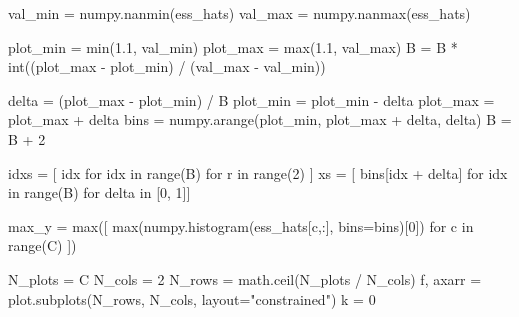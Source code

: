 \documentclass[
  letterpaper,
  DIV=11,
  numbers=noendperiod]{scrartcl}
\newenvironment{Shaded}{\begin{snugshade}}{\end{snugshade}}
\newcommand{\BuiltInTok}[1]{\textcolor[rgb]{0.00,0.23,0.31}{#1}}
\newcommand{\ControlFlowTok}[1]{\textcolor[rgb]{0.00,0.23,0.31}{#1}}
\newcommand{\DecValTok}[1]{\textcolor[rgb]{0.68,0.00,0.00}{#1}}
\newcommand{\FloatTok}[1]{\textcolor[rgb]{0.68,0.00,0.00}{#1}}
\newcommand{\KeywordTok}[1]{\textcolor[rgb]{0.00,0.23,0.31}{#1}}
\newcommand{\NormalTok}[1]{\textcolor[rgb]{0.00,0.23,0.31}{#1}}
\newcommand{\OperatorTok}[1]{\textcolor[rgb]{0.37,0.37,0.37}{#1}}
\newcommand{\StringTok}[1]{\textcolor[rgb]{0.13,0.47,0.30}{#1}}
\begin{document}
\begin{Shaded}
\begin{Highlighting}[]
\NormalTok{  val\_min }\OperatorTok{=}\NormalTok{ numpy.nanmin(ess\_hats)}
\NormalTok{  val\_max }\OperatorTok{=}\NormalTok{ numpy.nanmax(ess\_hats)}

\NormalTok{  plot\_min }\OperatorTok{=} \BuiltInTok{min}\NormalTok{(}\FloatTok{1.1}\NormalTok{, val\_min)}
\NormalTok{  plot\_max }\OperatorTok{=} \BuiltInTok{max}\NormalTok{(}\FloatTok{1.1}\NormalTok{, val\_max)}
\NormalTok{  B }\OperatorTok{=}\NormalTok{ B }\OperatorTok{*} \BuiltInTok{int}\NormalTok{((plot\_max }\OperatorTok{{-}}\NormalTok{ plot\_min) }\OperatorTok{/}\NormalTok{ (val\_max }\OperatorTok{{-}}\NormalTok{ val\_min))}

\NormalTok{  delta }\OperatorTok{=}\NormalTok{ (plot\_max }\OperatorTok{{-}}\NormalTok{ plot\_min) }\OperatorTok{/}\NormalTok{ B}
\NormalTok{  plot\_min }\OperatorTok{=}\NormalTok{ plot\_min }\OperatorTok{{-}}\NormalTok{ delta}
\NormalTok{  plot\_max }\OperatorTok{=}\NormalTok{ plot\_max }\OperatorTok{+}\NormalTok{ delta}
\NormalTok{  bins }\OperatorTok{=}\NormalTok{ numpy.arange(plot\_min, plot\_max }\OperatorTok{+}\NormalTok{ delta, delta)}
\NormalTok{  B }\OperatorTok{=}\NormalTok{ B }\OperatorTok{+} \DecValTok{2}

\NormalTok{  idxs }\OperatorTok{=}\NormalTok{ [ idx }\ControlFlowTok{for}\NormalTok{ idx }\KeywordTok{in} \BuiltInTok{range}\NormalTok{(B) }\ControlFlowTok{for}\NormalTok{ r }\KeywordTok{in} \BuiltInTok{range}\NormalTok{(}\DecValTok{2}\NormalTok{) ]}
\NormalTok{  xs }\OperatorTok{=}\NormalTok{ [ bins[idx }\OperatorTok{+}\NormalTok{ delta] }\ControlFlowTok{for}\NormalTok{ idx }\KeywordTok{in} \BuiltInTok{range}\NormalTok{(B) }\ControlFlowTok{for}\NormalTok{ delta }\KeywordTok{in}\NormalTok{ [}\DecValTok{0}\NormalTok{, }\DecValTok{1}\NormalTok{]]}

\NormalTok{  max\_y }\OperatorTok{=} \BuiltInTok{max}\NormalTok{([ }\BuiltInTok{max}\NormalTok{(numpy.histogram(ess\_hats[c,:], bins}\OperatorTok{=}\NormalTok{bins)[}\DecValTok{0}\NormalTok{])}
                \ControlFlowTok{for}\NormalTok{ c }\KeywordTok{in} \BuiltInTok{range}\NormalTok{(C) ])}

\NormalTok{  N\_plots }\OperatorTok{=}\NormalTok{ C}
\NormalTok{  N\_cols }\OperatorTok{=} \DecValTok{2}
\NormalTok{  N\_rows }\OperatorTok{=}\NormalTok{ math.ceil(N\_plots }\OperatorTok{/}\NormalTok{ N\_cols)}
\NormalTok{  f, axarr }\OperatorTok{=}\NormalTok{ plot.subplots(N\_rows, N\_cols, layout}\OperatorTok{=}\StringTok{"constrained"}\NormalTok{)}
\NormalTok{  k }\OperatorTok{=} \DecValTok{0}


\end{Highlighting}
\end{Shaded}
\end{document}
